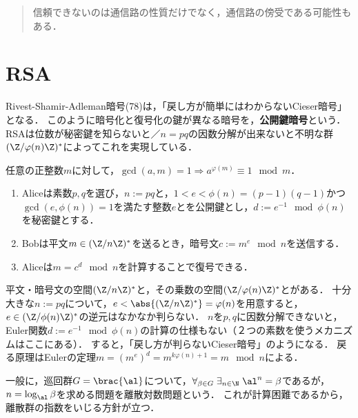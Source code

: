 \documentclass[uplatex,dvipdfmx]{jsreport}
\begin{document}
\begin{quotation}
    信頼できないのは通信路の性質だけでなく，通信路の傍受である可能性もある．
\end{quotation}

\section{RSA}

\begin{tcolorbox}[colframe=ForestGreen, colback=ForestGreen!10!white,breakable,colbacktitle=ForestGreen!40!white,coltitle=black,fonttitle=\bfseries\sffamily,
title=]
    Rivest-Shamir-Adleman暗号(78)は，「戻し方が簡単にはわからないCieser暗号」となる．
    このように暗号化と復号化の鍵が異なる暗号を，\textbf{公開鍵暗号}という．
    RSAは位数が秘密鍵を知らないと／$n=pq$の因数分解が出来ないと不明な群$(\Z/\varphi(n)\Z)^*$によってこれを実現している．
\end{tcolorbox}

\begin{theorem}[Euler]
    任意の正整数$m$に対して，$\gcd(a,m)=1\Rightarrow a^{\varphi(m)}\equiv1\mod m$．
\end{theorem}

\begin{definition}\mbox{}
    \begin{enumerate}
        \item Aliceは素数$p,q$を選び，$n:=pq$と，$1<e<\phi(n)=(p-1)(q-1)$かつ$\gcd(e,\phi(n))=1$を満たす整数$e$とを公開鍵とし，$d:=e^{-1}\mod\phi(n)$を秘密鍵とする．
        \item Bobは平文$m\in(\Z/n\Z)^*$を送るとき，暗号文$c:=m^e\mod n$を送信する．
        \item Aliceは$m=c^d\mod n$を計算することで復号できる．
    \end{enumerate}
\end{definition}
\begin{remarks}
    平文・暗号文の空間$(\Z/n\Z)^*$と，その乗数の空間$(\Z/\varphi(n)\Z)^*$とがある．
    十分大きな$n:=pq$について，$e<\abs{(\Z/n\Z)^*}=\varphi(n)$を用意すると，
    $e\in(\Z/\phi(n)\Z)^*$の逆元はなかなか判らない．
    $n$を$p,q$に因数分解できないと，Euler関数$d:=e^{-1}\mod\phi(n)$の計算の仕様もない（２つの素数を使うメカニズムはここにある）．
    すると，「戻し方が判らないCieser暗号」のようになる．
    戻る原理はEulerの定理$m=(m^e)^{d}=m^{k\varphi(n)+1}=m\mod n$による．
\end{remarks}

\begin{example}
    一般に，巡回群$G=\brac{\al}$について，$\forall_{\beta\in G}\;\exists_{n\in\N}\;\al^n=\beta$であるが，$n=\log_\al\beta$を求める問題を離散対数問題という．
    これが計算困難であるから，離散群の指数をいじる方針が立つ．
\end{example}
\end{document}
